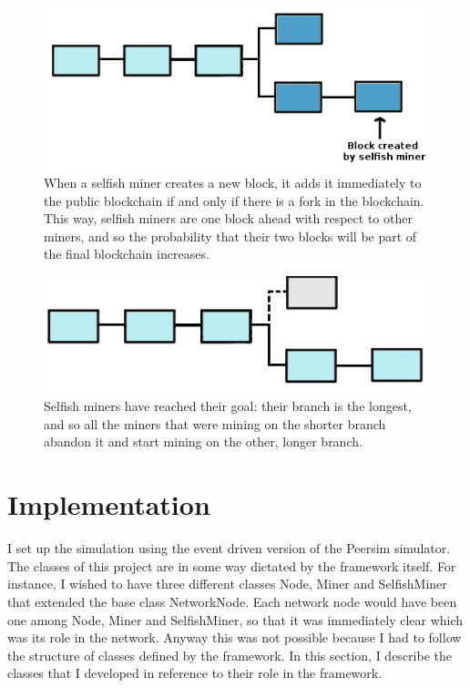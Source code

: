 \documentclass{article}
\begin{document}
\begin{figure}
\centerline{\includegraphics[scale=0.41]{fork_2b}}
\caption{When a selfish miner creates a new block, it adds it immediately to the public blockchain if and only if there is a fork in the blockchain. This way, selfish miners are one block ahead with respect to other miners, and so the probability that their two blocks will be part of the final blockchain increases.}
\label{fig:fork_2b}
\end{figure}

\begin{figure}
\centerline{\includegraphics[scale=0.41]{fork_resolved}}
\caption{Selfish miners have reached their goal: their branch is the longest, and so all the miners that were mining on the shorter branch abandon it and start mining on the other, longer branch.}
\label{fig:fork_resolved}
\end{figure}


\section{Implementation}  
I set up the simulation using the event driven version of the Peersim simulator. The classes of this project are in some way dictated by the framework itself. For instance, I wished to have three different classes Node, Miner and SelfishMiner that extended the base class NetworkNode. Each network node would have been one among Node, Miner and SelfishMiner, so that it was immediately clear which was its role in the network. Anyway this was not possible because I had to follow the structure of classes defined by the framework. In this section, I describe the classes that I developed in reference to their role in the framework.
\end{document}
